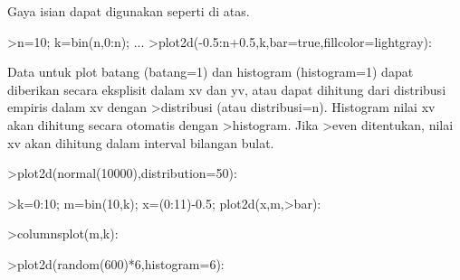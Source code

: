 \documentclass[a4paper,10pt]{article}
\begin{document}
\begin{eulernotebook}
\begin{eulercomment}
\begin{eulercomment}
\begin{eulercomment}
\begin{eulercomment}
\begin{eulercomment}
\begin{eulercomment}
\begin{eulercomment}
\begin{eulercomment}
\begin{eulercomment}
\begin{eulercomment}
\begin{eulercomment}
\begin{eulercomment}
\begin{eulercomment}
\begin{eulercomment}
\begin{eulercomment}
\begin{eulercomment}
\begin{eulercomment}
\begin{eulercomment}
\begin{eulercomment}
\begin{eulercomment}
\begin{eulercomment}
\begin{eulercomment}
\begin{eulercomment}
\begin{eulercomment}
\begin{eulercomment}
\begin{eulercomment}
\begin{eulercomment}
\begin{eulercomment}
\begin{eulercomment}
\begin{eulercomment}
\begin{eulercomment}
\begin{eulercomment}
\begin{eulercomment}
\begin{eulercomment}
\begin{eulercomment}
\begin{eulercomment}
\begin{eulercomment}
Gaya isian dapat digunakan seperti di atas.
\end{eulercomment}
\begin{eulerprompt}
>n=10; k=bin(n,0:n); ...
>plot2d(-0.5:n+0.5,k,bar=true,fillcolor=lightgray):
\end{eulerprompt}
\begin{eulercomment}
Data untuk plot batang (batang=1) dan histogram (histogram=1) dapat
diberikan secara eksplisit dalam xv dan yv, atau dapat dihitung dari
distribusi empiris dalam xv dengan \textgreater{}distribusi (atau distribusi=n).
Histogram nilai xv akan dihitung secara otomatis dengan \textgreater{}histogram.
Jika \textgreater{}even ditentukan, nilai xv akan dihitung dalam interval bilangan
bulat.
\end{eulercomment}
\begin{eulerprompt}
>plot2d(normal(10000),distribution=50):
\end{eulerprompt}
\begin{eulerprompt}
>k=0:10; m=bin(10,k); x=(0:11)-0.5; plot2d(x,m,>bar):
\end{eulerprompt}
\begin{eulerprompt}
>columnsplot(m,k):
\end{eulerprompt}
\begin{eulerprompt}
>plot2d(random(600)*6,histogram=6):
\end{eulerprompt}

\end{eulercomment}
\end{eulercomment}
\end{eulercomment}
\end{eulercomment}
\end{eulercomment}
\end{eulercomment}
\end{eulercomment}
\end{eulercomment}
\end{eulercomment}
\end{eulercomment}
\end{eulercomment}
\end{eulercomment}
\end{eulercomment}
\end{eulercomment}
\end{eulercomment}
\end{eulercomment}
\end{eulercomment}
\end{eulercomment}
\end{eulercomment}
\end{eulercomment}
\end{eulercomment}
\end{eulercomment}
\end{eulercomment}
\end{eulercomment}
\end{eulercomment}
\end{eulercomment}
\end{eulercomment}
\end{eulercomment}
\end{eulercomment}
\end{eulercomment}
\end{eulercomment}
\end{eulercomment}
\end{eulercomment}
\end{eulercomment}
\end{eulercomment}
\end{eulercomment}
\end{eulernotebook}
\end{document}
